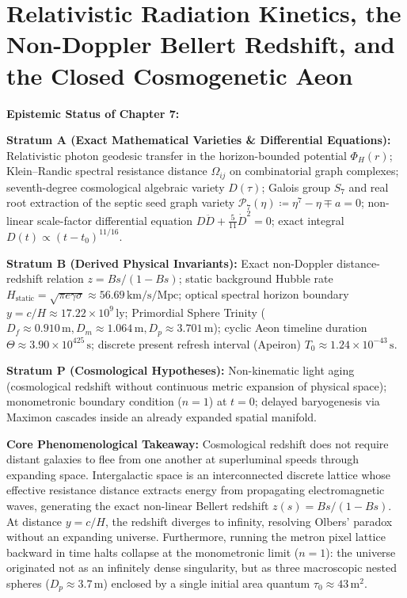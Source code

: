 \documentclass[
    12pt,
    a4paper,
    headings=normal,
    twoside=false,
    open=any,
    parskip=half
]{scrbook}
\begin{document}
\chapter{Relativistic Radiation Kinetics, the Non-Doppler Bellert Redshift, and the Closed Cosmogenetic Aeon}
\label{chap:ch7_expanded}

\begin{firewallbox}
\textbf{Epistemic Status of Chapter 7:}\par\smallskip\noindent
\textbf{Stratum A (Exact Mathematical Varieties \& Differential Equations):} Relativistic photon geodesic transfer in the horizon-bounded potential $\Phi_H(r)$; Klein--Randic spectral resistance distance $\Omega_{ij}$ on combinatorial graph complexes; seventh-degree cosmological algebraic variety $D(\tau)$; Galois group $S_7$ and real root extraction of the septic seed graph variety $\mathcal{P}_7(\eta) \coloneqq \eta^7 - \eta \mp a = 0$; non-linear scale-factor differential equation $D\ddot{D} + \frac{5}{11}\dot{D}^2 = 0$; exact integral $D(t) \propto (t - t_0)^{11/16}$.\par\smallskip\noindent
\textbf{Stratum B (Derived Physical Invariants):} Exact non-Doppler distance-redshift relation $z = Bs / (1 - Bs)$; static background Hubble rate $H_{\text{static}} = \sqrt{\pi e \gamma \sigma} \approx 56.69\,\text{km/s/Mpc}$; optical spectral horizon boundary $y = c/H \approx 17.22 \times 10^9\,\text{ly}$; Primordial Sphere Trinity ($D_f \approx 0.910\,\text{m}, D_m \approx 1.064\,\text{m}, D_p \approx 3.701\,\text{m}$); cyclic Aeon timeline duration $\Theta \approx 3.90 \times 10^{425}\,\text{s}$; discrete present refresh interval (Apeiron) $T_0 \approx 1.24 \times 10^{-43}\,\text{s}$.\par\smallskip\noindent
\textbf{Stratum P (Cosmological Hypotheses):} Non-kinematic light aging (cosmological redshift without continuous metric expansion of physical space); monometronic boundary condition ($n = 1$) at $t = 0$; delayed baryogenesis via Maximon cascades inside an already expanded spatial manifold.\par\smallskip\noindent
\textbf{Core Phenomenological Takeaway:} Cosmological redshift does not require distant galaxies to flee from one another at superluminal speeds through expanding space. Intergalactic space is an interconnected discrete lattice whose effective resistance distance extracts energy from propagating electromagnetic waves, generating the exact non-linear Bellert redshift $z(s) = Bs/(1 - Bs)$. At distance $y = c/H$, the redshift diverges to infinity, resolving Olbers' paradox without an expanding universe. Furthermore, running the metron pixel lattice backward in time halts collapse at the monometronic limit ($n = 1$): the universe originated not as an infinitely dense singularity, but as three macroscopic nested spheres ($D_p \approx 3.7\,\text{m}$) enclosed by a single initial area quantum $\tau_0 \approx 43\,\text{m}^2$.
\end{firewallbox}
\end{document}
